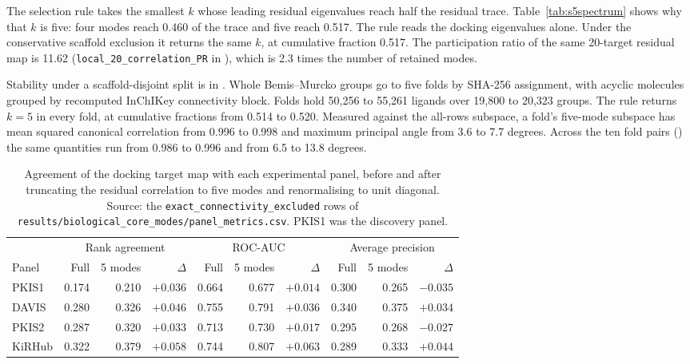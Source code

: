 The selection rule takes the smallest $k$ whose leading residual eigenvalues reach half the
residual trace. Table~\ref{tab:s5spectrum} shows why that $k$ is five: four modes reach 0.460 of
the trace and five reach 0.517. The rule reads the docking eigenvalues alone. Under the
conservative scaffold exclusion it returns the same $k$, at cumulative fraction 0.517. The
participation ratio of the same 20-target residual map is 11.62
(\texttt{local\_20\_correlation\_PR} in ), which is 2.3
times the number of retained modes.

Stability under a scaffold-disjoint split is in
. Whole Bemis--Murcko groups
go to five folds by SHA-256 assignment, with acyclic molecules grouped by recomputed InChIKey
connectivity block. Folds hold 50{,}256 to 55{,}261 ligands over 19{,}800 to 20{,}323 groups. The
rule returns $k=5$ in every fold, at cumulative fractions from 0.514 to 0.520. Measured against
the all-rows subspace, a fold's five-mode subspace has mean squared canonical correlation from
0.996 to 0.998 and maximum principal angle from 3.6 to 7.7 degrees. Across the ten fold pairs
() the same
quantities run from 0.986 to 0.996 and from 6.5 to 13.8 degrees.

\begin{table}[htbp]
\centering
\caption{Agreement of the docking target map with each experimental panel, before and after
truncating the residual correlation to five modes and renormalising to unit diagonal. Source: the
\texttt{exact\_connectivity\_excluded} rows of
\texttt{results/biological\_core\_modes/panel\_metrics.csv}. PKIS1 was the discovery panel.}
\label{tab:s5panels}
\small
\begin{tabular}{lrrrrrrrrr}
\toprule
& \multicolumn{3}{c}{Rank agreement} & \multicolumn{3}{c}{ROC-AUC} & \multicolumn{3}{c}{Average precision} \\
\cmidrule(lr){2-4}\cmidrule(lr){5-7}\cmidrule(lr){8-10}
Panel & Full & 5 modes & $\Delta$ & Full & 5 modes & $\Delta$ & Full & 5 modes & $\Delta$ \\
\midrule
PKIS1 & 0.174 & 0.210 & $+0.036$ & 0.664 & 0.677 & $+0.014$ & 0.300 & 0.265 & $-0.035$ \\
DAVIS & 0.280 & 0.326 & $+0.046$ & 0.755 & 0.791 & $+0.036$ & 0.340 & 0.375 & $+0.034$ \\
PKIS2 & 0.287 & 0.320 & $+0.033$ & 0.713 & 0.730 & $+0.017$ & 0.295 & 0.268 & $-0.027$ \\
KiRHub & 0.322 & 0.379 & $+0.058$ & 0.744 & 0.807 & $+0.063$ & 0.289 & 0.333 & $+0.044$ \\
\bottomrule
\end{tabular}
\end{table}

